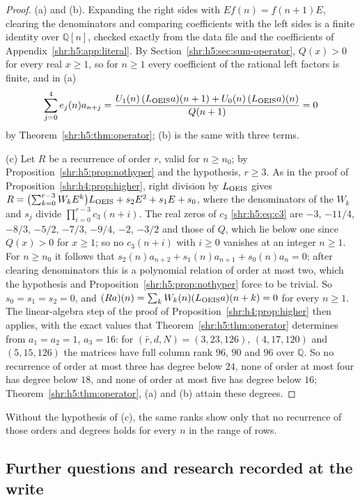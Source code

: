 \documentclass[11pt,letterpaper]{article}
\numberwithin{equation}{section}
\theoremstyle{definition}
\newcommand{\Q}{\mathbb Q}
\newcommand{\1}{\mathbf 1}
\begin{document}
\begin{proof}
(a) and (b). Expanding the right sides with $Ef(n)=f(n+1)E$, clearing the
denominators and comparing coefficients with the left sides is a finite
identity over $\Q[n]$, checked exactly from the data file and the
coefficients of Appendix~\ref{shr:h5:app:literal}. By
Section~\ref{shr:h5:sec:sum-operator}, $Q(x)>0$ for every real $x\ge1$, so
for $n\ge1$ every coefficient of the rational left factors is finite, and
in (a)
\[
 \sum_{j=0}^4e_j(n)a_{n+j}
 =\frac{U_1(n)\,(L_{\rm OEIS}a)(n+1)+U_0(n)\,(L_{\rm OEIS}a)(n)}{Q(n+1)}=0
\]
by Theorem~\ref{shr:h5:thm:operator}; (b) is the same with three terms.

(c) Let $R$ be a recurrence of order $r$, valid for $n\ge n_0$; by
Proposition~\ref{shr:h5:prop:nothyper} and the hypothesis, $r\ge3$. As in
the proof of Proposition~\ref{shr:h4:prop:higher}, right division by
$L_{\rm OEIS}$ gives
$R=\bigl(\sum_{k=0}^{r-3}W_kE^k\bigr)L_{\rm OEIS}+s_2E^2+s_1E+s_0$, where
the denominators of the $W_k$ and $s_j$ divide
$\prod_{i=0}^{r-3}c_3(n+i)$. The real zeros of $c_3$ \eqref{shr:h5:eq:c3}
are $-3$, $-11/4$, $-8/3$, $-5/2$, $-7/3$, $-9/4$, $-2$, $-3/2$ and those
of $Q$, which lie below one since $Q(x)>0$ for $x\ge1$; so no $c_3(n+i)$
with $i\ge0$ vanishes at an integer $n\ge1$. For $n\ge n_0$ it follows that
$s_2(n)a_{n+2}+s_1(n)a_{n+1}+s_0(n)a_n=0$; after clearing denominators
this is a polynomial relation of order at most two, which the hypothesis
and Proposition~\ref{shr:h5:prop:nothyper} force to be trivial. So
$s_0=s_1=s_2=0$, and $(Ra)(n)=\sum_kW_k(n)(L_{\rm OEIS}a)(n+k)=0$ for every
$n\ge1$. The linear-algebra step of the proof of
Proposition~\ref{shr:h4:prop:higher} then applies, with the exact values
that Theorem~\ref{shr:h5:thm:operator} determines from $a_1=a_2=1$,
$a_3=16$: for $(\bar r,d,N)=(3,23,126)$, $(4,17,120)$ and $(5,15,126)$ the
matrices have full column rank $96$, $90$ and $96$ over $\Q$. So no
recurrence of order at most three has degree below $24$, none of order at
most four has degree below $18$, and none of order at most five has degree
below $16$; Theorem~\ref{shr:h5:thm:operator}, (a) and (b) attain these
degrees.
\end{proof}

Without the hypothesis of (c), the same ranks show only that no recurrence
of those orders and degrees holds for every $n$ in the range of rows.

\subsection{Further questions and research recorded at the write}
\label{shr:h5:sec:further}
\end{document}
